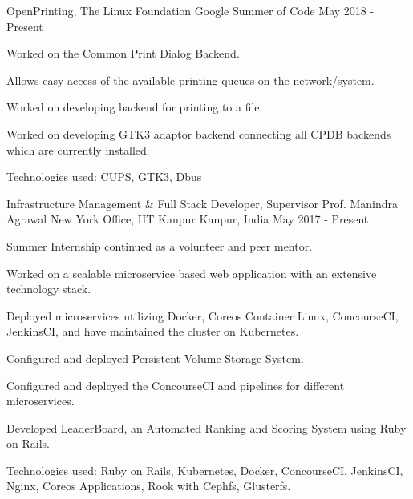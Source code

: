 

\begin{cventries}


  \cventry
    {OpenPrinting, The Linux Foundation} %
    {Google Summer of Code} %
    {} %
    {May 2018 - Present} %
    {
      \begin{cvitems} %
        \item {Worked on the Common Print Dialog Backend.}
        \item {Allows easy access of the available printing queues on the network/system.}
        \item {Worked on developing backend for printing to a file.}
        \item {Worked on developing GTK3 adaptor backend connecting all CPDB backends which are currently installed.}
        \item {Technologies used: CUPS, GTK3, Dbus}
      \end{cvitems}
    }


  \cventry
    {Infrastructure Management \& Full Stack Developer, Supervisor Prof. Manindra Agrawal} %
    {New York Office, IIT Kanpur} %
    {Kanpur, India} %
    {May 2017 - Present} %
    {
      \begin{cvitems} %
        \item {Summer Internship continued as a volunteer and peer mentor.}
        \item {Worked on a scalable microservice based web application with an extensive technology stack.}
        \item {Deployed microservices utilizing Docker, Coreos Container Linux, ConcourseCI, JenkinsCI, and have maintained the cluster on Kubernetes.}
        \item {Configured and deployed Persistent Volume Storage System.}
        \item {Configured and deployed the ConcourseCI and pipelines for different microservices.}
        \item {Developed LeaderBoard, an Automated Ranking and Scoring System using Ruby on Rails.}
        \item {Technologies used: Ruby on Rails, Kubernetes, Docker, ConcourseCI, JenkinsCI, Nginx, Coreos Applications, Rook with Cephfs, Glusterfs.}
      \end{cvitems}
    }

\end{cventries}
